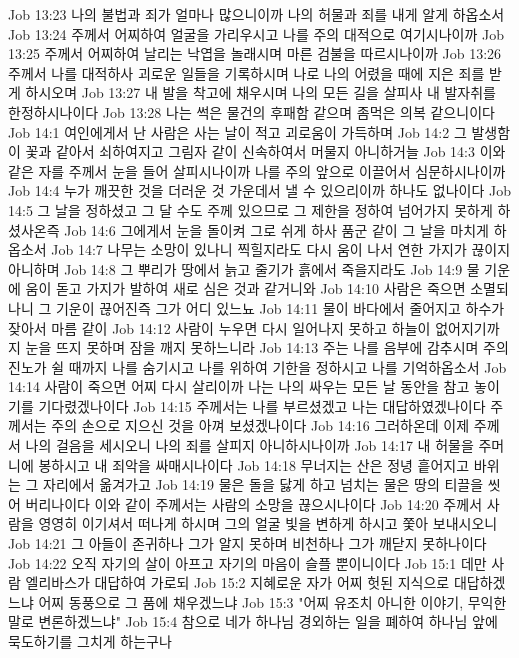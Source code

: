 Job 13:23  나의 불법과 죄가 얼마나 많으니이까 나의 허물과 죄를 내게 알게 하옵소서
Job 13:24  주께서 어찌하여 얼굴을 가리우시고 나를 주의 대적으로 여기시나이까
Job 13:25  주께서 어찌하여 날리는 낙엽을 놀래시며 마른 검불을 따르시나이까
Job 13:26  주께서 나를 대적하사 괴로운 일들을 기록하시며 나로 나의 어렸을 때에 지은 죄를 받게 하시오며
Job 13:27  내 발을 착고에 채우시며 나의 모든 길을 살피사 내 발자취를 한정하시나이다
Job 13:28  나는 썩은 물건의 후패함 같으며 좀먹은 의복 같으니이다
Job 14:1  여인에게서 난 사람은 사는 날이 적고 괴로움이 가득하며
Job 14:2  그 발생함이 꽃과 같아서 쇠하여지고 그림자 같이 신속하여서 머물지 아니하거늘
Job 14:3  이와 같은 자를 주께서 눈을 들어 살피시나이까 나를 주의 앞으로 이끌어서 심문하시나이까
Job 14:4  누가 깨끗한 것을 더러운 것 가운데서 낼 수 있으리이까 하나도 없나이다
Job 14:5  그 날을 정하셨고 그 달 수도 주께 있으므로 그 제한을 정하여 넘어가지 못하게 하셨사온즉
Job 14:6  그에게서 눈을 돌이켜 그로 쉬게 하사 품군 같이 그 날을 마치게 하옵소서
Job 14:7  나무는 소망이 있나니 찍힐지라도 다시 움이 나서 연한 가지가 끊이지 아니하며
Job 14:8  그 뿌리가 땅에서 늙고 줄기가 흙에서 죽을지라도
Job 14:9  물 기운에 움이 돋고 가지가 발하여 새로 심은 것과 같거니와
Job 14:10  사람은 죽으면 소멸되나니 그 기운이 끊어진즉 그가 어디 있느뇨
Job 14:11  물이 바다에서 줄어지고 하수가 잦아서 마름 같이
Job 14:12  사람이 누우면 다시 일어나지 못하고 하늘이 없어지기까지 눈을 뜨지 못하며 잠을 깨지 못하느니라
Job 14:13  주는 나를 음부에 감추시며 주의 진노가 쉴 때까지 나를 숨기시고 나를 위하여 기한을 정하시고 나를 기억하옵소서
Job 14:14  사람이 죽으면 어찌 다시 살리이까 나는 나의 싸우는 모든 날 동안을 참고 놓이기를 기다렸겠나이다
Job 14:15  주께서는 나를 부르셨겠고 나는 대답하였겠나이다 주께서는 주의 손으로 지으신 것을 아껴 보셨겠나이다
Job 14:16  그러하온데 이제 주께서 나의 걸음을 세시오니 나의 죄를 살피지 아니하시나이까
Job 14:17  내 허물을 주머니에 봉하시고 내 죄악을 싸매시나이다
Job 14:18  무너지는 산은 정녕 흩어지고 바위는 그 자리에서 옮겨가고
Job 14:19  물은 돌을 닳게 하고 넘치는 물은 땅의 티끌을 씻어 버리나이다 이와 같이 주께서는 사람의 소망을 끊으시나이다
Job 14:20  주께서 사람을 영영히 이기셔서 떠나게 하시며 그의 얼굴 빛을 변하게 하시고 쫓아 보내시오니
Job 14:21  그 아들이 존귀하나 그가 알지 못하며 비천하나 그가 깨닫지 못하나이다
Job 14:22  오직 자기의 살이 아프고 자기의 마음이 슬플 뿐이니이다
Job 15:1  데만 사람 엘리바스가 대답하여 가로되
Job 15:2  지혜로운 자가 어찌 헛된 지식으로 대답하겠느냐 어찌 동풍으로 그 품에 채우겠느냐
Job 15:3  "어찌 유조치 아니한 이야기, 무익한 말로 변론하겠느냐"
Job 15:4  참으로 네가 하나님 경외하는 일을 폐하여 하나님 앞에 묵도하기를 그치게 하는구나
